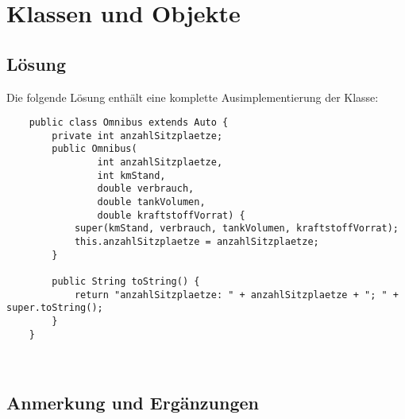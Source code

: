 \chapter{Klassen und Objekte}

\section{Lösung}

Die folgende Lösung enthält eine komplette Ausimplementierung der Klasse:

\begin{verbatim}
    public class Omnibus extends Auto {
        private int anzahlSitzplaetze;
        public Omnibus(
                int anzahlSitzplaetze,
                int kmStand,
                double verbrauch,
                double tankVolumen,
                double kraftstoffVorrat) {
            super(kmStand, verbrauch, tankVolumen, kraftstoffVorrat);
            this.anzahlSitzplaetze = anzahlSitzplaetze;
        }

        public String toString() {
            return "anzahlSitzplaetze: " + anzahlSitzplaetze + "; " + super.toString();
        }
    }
\end{verbatim}\\

\section{Anmerkung und Ergänzungen}

